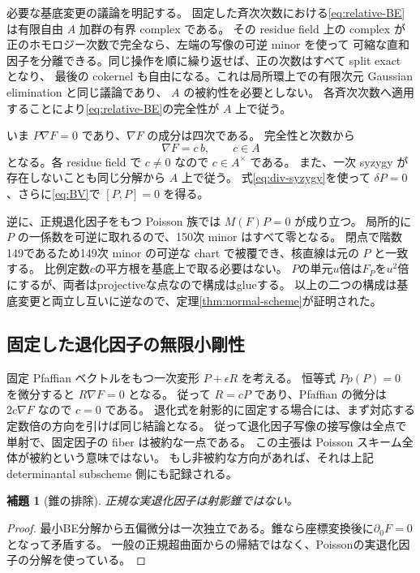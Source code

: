 \documentclass[11pt,a4paper]{ltjsarticle}
\newtheorem{lemma}[theorem]{補題}
\theoremstyle{remark}\newtheorem{remark}[theorem]{注意}
\begin{document}
必要な基底変更の議論を明記する。
固定した斉次次数における\eqref{eq:relative-BE}は有限自由 $A$ 加群の有界 complex である。
その residue field 上の complex が正のホモロジー次数で完全なら、左端の写像の可逆 minor を使って
可縮な直和因子を分離できる。同じ操作を順に繰り返せば、正の次数はすべて split exact となり、
最後の cokernel も自由になる。これは局所環上での有限次元 Gaussian elimination と同じ議論であり、
$A$ の被約性を必要としない。
各斉次次数へ適用することにより\eqref{eq:relative-BE}の完全性が $A$ 上で従う。

いま $P\nabla F=0$ であり、$\nabla F$ の成分は四次である。
完全性と次数から
\[
                        \nabla F=c\,b,\qquad c\in A
\]
となる。各 residue field で $c\ne0$ なので $c\in A^\times$ である。
また、一次 syzygy が存在しないことも同じ分解から $A$ 上で従う。
式\eqref{eq:div-syzygy}を使って $\delta P=0$、さらに\eqref{eq:BV}で $[P,P]=0$ を得る。

逆に、正規退化因子をもつ Poisson 族では $M(F)P=0$ が成り立つ。
局所的に $P$ の一係数を可逆に取れるので、150次 minor はすべて零となる。
閉点で階数149であるため149次 minor の可逆な chart で被覆でき、核直線は元の $P$ と一致する。
比例定数$c$の平方根を基底上で取る必要はない。
$P$の単元$u$倍は$F_P$を$u^2$倍にするが、両者はprojectiveな点なので構成はglueする。
以上の二つの構成は基底変更と両立し互いに逆なので、定理\ref{thm:normal-scheme}が証明された。

\subsection{固定した退化因子の無限小剛性}

固定 Pfaffian ベクトルをもつ一次変形 $P+\epsilon R$ を考える。
恒等式 $Pp(P)=0$ を微分すると $R\nabla F=0$ となる。
従って $R=cP$ であり、Pfaffian の微分は $2c\nabla F$ なので $c=0$ である。
退化式を射影的に固定する場合には、まず対応する定数倍の方向を引けば同じ結論となる。
従って退化因子写像の接写像は全点で単射で、固定因子の fiber は被約な一点である。
この主張は Poisson スキーム全体が被約という意味ではない。
もし非被約な方向があれば、それは上記 determinantal subscheme 側にも記録される。



\begin{lemma}[錐の排除]\label{lem:no-cone}
正規な実退化因子は射影錐ではない。
\end{lemma}
\begin{proof}
最小BE分解から五偏微分は一次独立である。錐なら座標変換後に$\partial_0F=0$となって矛盾する。
一般の正規超曲面からの帰結ではなく、Poissonの実退化因子の分解を使っている。
\end{proof}
\end{document}
